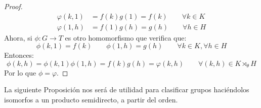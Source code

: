 \begin{teo}
\begin{proof}
        \begin{align*}
            \varphi(k,1) &= f(k)g(1) = f(k) \qquad \forall k\in K \\
            \varphi(1,h) &= f(1)g(h) = g(h) \qquad \forall h\in H
        \end{align*}
        Ahora, si $\phi:G\to T$ es otro homomorfismo que verifica que:
        \begin{equation*}
            \phi(k,1) = f(k) \qquad \phi(1,h) = g(h) \qquad \forall k\in K, \forall h\in H
        \end{equation*}
        Entonces:
        \begin{equation*}
            \phi(k,h) = \phi(k,1)\phi(1,h) = f(k)g(h) = \varphi(k,h) \qquad \forall (k,h)\in K\rtimes_\theta H
        \end{equation*}
        Por lo que $\phi = \varphi$.
    \end{proof}
\end{teo}

\noindent
La siguiente Proposición nos será de utilidad para clasificar grupos haciéndolos isomorfos a un producto semidirecto, a partir del orden.

